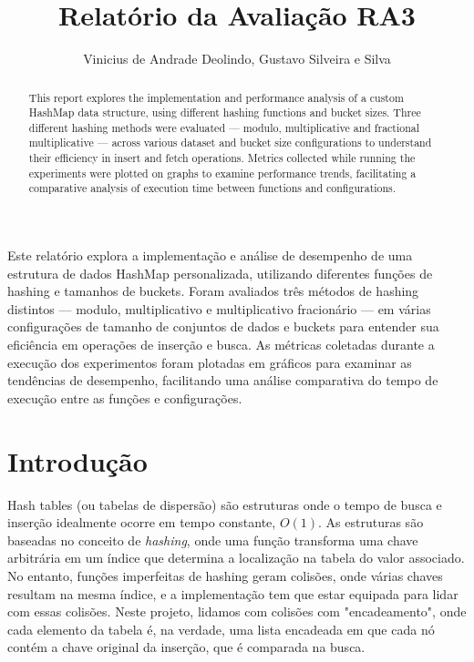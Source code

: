\documentclass[12pt]{article}
\title{Relatório da Avaliação RA3}
\author{Vinicius de Andrade Deolindo\inst{1}, Gustavo Silveira e Silva\inst{1}}
\begin{document}
 

\maketitle

\begin{abstract}
This report explores the implementation and performance analysis of a custom HashMap data structure, 
using different hashing functions and bucket sizes.
Three different hashing methods were evaluated — modulo, multiplicative and fractional multiplicative — 
across various dataset and bucket size configurations to understand their efficiency in insert and fetch operations.
Metrics collected while running the experiments were plotted on graphs to examine performance trends,
facilitating a comparative analysis of execution time between functions and configurations.
\end{abstract}

\begin{resumo}
Este relatório explora a implementação e análise de desempenho de uma estrutura de dados HashMap personalizada, 
utilizando diferentes funções de hashing e tamanhos de buckets.
Foram avaliados três métodos de hashing distintos — modulo, multiplicativo e multiplicativo fracionário — 
em várias configurações de tamanho de conjuntos de dados e buckets para entender sua eficiência em operações de inserção e busca.
As métricas coletadas durante a execução dos experimentos foram plotadas em gráficos para examinar as tendências de desempenho,
facilitando uma análise comparativa do tempo de execução entre as funções e configurações. 
\end{resumo}

\section{Introdução}
Hash tables (ou tabelas de dispersão) são estruturas onde o tempo de busca e inserção idealmente ocorre em tempo constante, $O(1)$. 
As estruturas são baseadas no conceito de \textit{hashing}, onde uma função transforma uma chave arbitrária em um índice que determina a localização na tabela do valor associado.
No entanto, funções imperfeitas de hashing geram colisões, onde várias chaves resultam na mesma índice, 
e a implementação tem que estar equipada para lidar com essas colisões. Neste projeto, lidamos com colisões com "encadeamento", onde cada elemento da tabela é, na verdade,
uma lista encadeada em que cada nó contém a chave original da inserção, que é comparada na busca.
\end{document}
